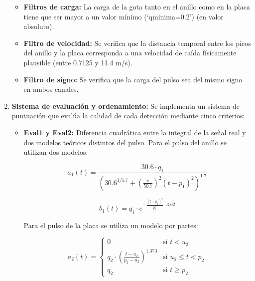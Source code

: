 \documentclass[12pt,a4paper]{article}
\begin{document}
\begin{enumerate}
\begin{itemize}

\item \textbf{Filtros de carga:} La carga de la gota tanto en el anillo como en la placa tiene
que ser mayor a un valor mínimo (`qminima=0.2') (en valor absoluto).

\item \textbf{Filtro de velocidad:} Se verifica que la distancia temporal entre los picos del
anillo y la placa corresponda a una velocidad de caída físicamente plausible
(entre 0.7125 y 11.4 m/s).

\item \textbf{Filtro de signo:} Se verifica que la carga del pulso sea del mismo signo en
ambos canales.
\end{itemize}

\item \textbf{Sistema de evaluación y ordenamiento:} Se implementa un sistema de puntuación que evalúa la calidad de cada detección mediante cinco criterios:

\begin{itemize}

    \item \textbf{Eval1 y Eval2:} Diferencia cuadrática entre la integral de la señal real y dos modelos teóricos distintos
    del pulso.
    Para el pulso del anillo se utilizan dos modelos:
    
    \begin{equation}
        a_1(t) = \frac{30.6 \cdot q_1}{\left(30.6^{1/1.7} + \left(\frac{v}{50.7}\right)^2(t-p_1)^2\right)^{1.7}}
    \end{equation}
    
    \begin{equation}
        b_1(t) = q_1 \cdot e^{-\frac{(t-p_1)^2}{p_1^2} \cdot 3.62}
    \end{equation}

    Para el pulso de la placa se utiliza un modelo por partes:

    \begin{equation}
        a_2(t) = \begin{cases}
            0 & \text{si } t < u_2 \\
            q_2 \cdot \left(\frac{t-u_2}{p_2-u_2}\right)^{1.373} & \text{si } u_2 \leq t < p_2 \\
            q_2 & \text{si } t \geq p_2
        \end{cases}
    \end{equation}


\end{itemize}
\end{enumerate}
\end{document}
